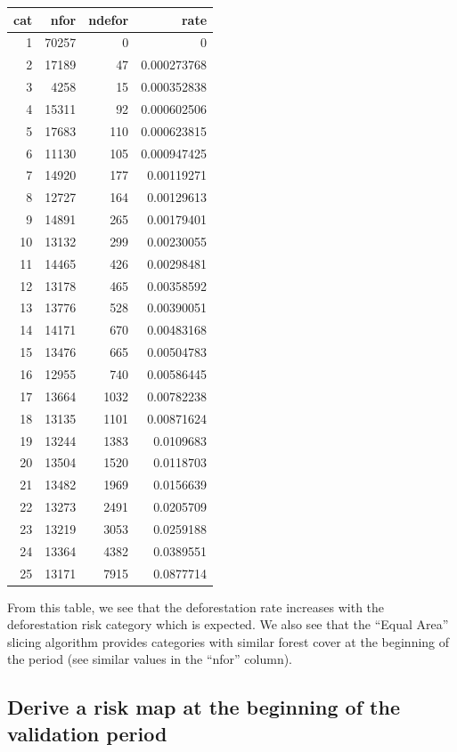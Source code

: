 \documentclass[paper=a4, 12pt, DIV=12]{scrartcl}
\begin{document}
\begin{center}
\begin{tabular}{rrrr}
cat & nfor & ndefor & rate\\
\hline
1 & 70257 & 0 & 0\\
2 & 17189 & 47 & 0.000273768\\
3 & 4258 & 15 & 0.000352838\\
4 & 15311 & 92 & 0.000602506\\
5 & 17683 & 110 & 0.000623815\\
6 & 11130 & 105 & 0.000947425\\
7 & 14920 & 177 & 0.00119271\\
8 & 12727 & 164 & 0.00129613\\
9 & 14891 & 265 & 0.00179401\\
10 & 13132 & 299 & 0.00230055\\
11 & 14465 & 426 & 0.00298481\\
12 & 13178 & 465 & 0.00358592\\
13 & 13776 & 528 & 0.00390051\\
14 & 14171 & 670 & 0.00483168\\
15 & 13476 & 665 & 0.00504783\\
16 & 12955 & 740 & 0.00586445\\
17 & 13664 & 1032 & 0.00782238\\
18 & 13135 & 1101 & 0.00871624\\
19 & 13244 & 1383 & 0.0109683\\
20 & 13504 & 1520 & 0.0118703\\
21 & 13482 & 1969 & 0.0156639\\
22 & 13273 & 2491 & 0.0205709\\
23 & 13219 & 3053 & 0.0259188\\
24 & 13364 & 4382 & 0.0389551\\
25 & 13171 & 7915 & 0.0877714\\
\end{tabular}
\end{center}

From this table, we see that the deforestation rate increases with the deforestation risk category which is expected. We also see that the ``Equal Area'' slicing algorithm provides categories with similar forest cover at the beginning of the period (see similar values in the ``nfor'' column).

\subsection{Derive a risk map at the beginning of the validation period}
\label{sec:orga088b7f}
\end{document}
